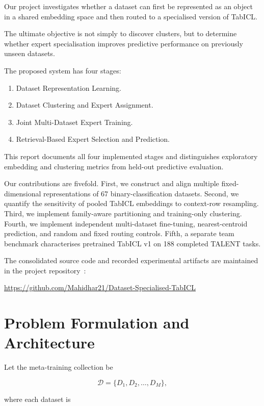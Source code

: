 \documentclass[conference]{IEEEtran}
\begin{document}
Our project investigates whether a dataset can first be represented as an object in a shared embedding space and then routed to a specialised version of TabICL.

The ultimate objective is not simply to discover clusters, but to determine whether expert specialisation improves predictive performance on previously unseen datasets.

The proposed system has four stages:

\begin{enumerate}
\item Dataset Representation Learning.
\item Dataset Clustering and Expert Assignment.
\item Joint Multi-Dataset Expert Training.
\item Retrieval-Based Expert Selection and Prediction.
\end{enumerate}

This report documents all four implemented stages and distinguishes exploratory embedding and clustering metrics from held-out predictive evaluation.

Our contributions are fivefold. First, we construct and align multiple fixed-dimensional representations of 67 binary-classification datasets. Second, we quantify the sensitivity of pooled TabICL embeddings to context-row resampling. Third, we implement family-aware partitioning and training-only clustering. Fourth, we implement independent multi-dataset fine-tuning, nearest-centroid prediction, and random and fixed routing controls. Fifth, a separate team benchmark characterises pretrained TabICL v1 on 188 completed TALENT tasks.

The consolidated source code and recorded experimental artifacts are maintained in the project repository~\cite{project}:

\url{https://github.com/Mahidhar21/Dataset-Specialised-TabICL}

\section{Problem Formulation and Architecture}

Let the meta-training collection be

\begin{equation}
\mathcal{D} = \{D_1,D_2,\ldots,D_M\},
\end{equation}

where each dataset is
\end{document}
